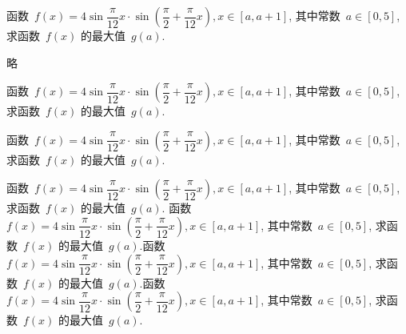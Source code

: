 \documentclass[marginline]{BHCexam}
\begin{document}
\begin{questions}
\jiandac
\question[18] 函数~$f(x)=4\sin\dfrac{\pi}{12}x\cdot\sin
    \left(\dfrac{\pi}{2}+\dfrac{\pi}{12}x\right),x\in[a,a+1]$,
    其中常数~$a\in[0,5]$, 求函数~$f(x)$ 的最大值~$g(a)$.

\begin{solution}
略
\end{solution}

\question[18] 函数~$f(x)=4\sin\dfrac{\pi}{12}x\cdot\sin
\left(\dfrac{\pi}{2}+\dfrac{\pi}{12}x\right),x\in[a,a+1]$,
其中常数~$a\in[0,5]$, 求函数~$f(x)$ 的最大值~$g(a)$.

\jiandad
\question[18] 函数~$f(x)=4\sin\dfrac{\pi}{12}x\cdot\sin
\left(\dfrac{\pi}{2}+\dfrac{\pi}{12}x\right),x\in[a,a+1]$,
其中常数~$a\in[0,5]$, 求函数~$f(x)$ 的最大值~$g(a)$.


\jiandae
\question[18] 函数~$f(x)=4\sin\dfrac{\pi}{12}x\cdot\sin
\left(\dfrac{\pi}{2}+\dfrac{\pi}{12}x\right),x\in[a,a+1]$,
其中常数~$a\in[0,5]$, 求函数~$f(x)$ 的最大值~$g(a)$.
\jiandaf
\question[18] 函数~$f(x)=4\sin\dfrac{\pi}{12}x\cdot\sin
\left(\dfrac{\pi}{2}+\dfrac{\pi}{12}x\right),x\in[a,a+1]$,
其中常数~$a\in[0,5]$, 求函数~$f(x)$ 的最大值~$g(a)$.函数~$f(x)=4\sin\dfrac{\pi}{12}x\cdot\sin
\left(\dfrac{\pi}{2}+\dfrac{\pi}{12}x\right),x\in[a,a+1]$,
其中常数~$a\in[0,5]$, 求函数~$f(x)$ 的最大值~$g(a)$.函数~$f(x)=4\sin\dfrac{\pi}{12}x\cdot\sin
\left(\dfrac{\pi}{2}+\dfrac{\pi}{12}x\right),x\in[a,a+1]$,
其中常数~$a\in[0,5]$, 求函数~$f(x)$ 的最大值~$g(a)$.
\end{questions}
\end{document}
